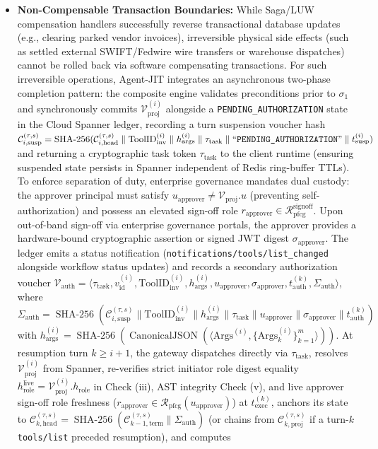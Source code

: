 \documentclass[conference,10pt]{IEEEtran}
\begin{document}
\begin{itemize}
    \item \textbf{Non-Compensable Transaction Boundaries:} While Saga/LUW compensation handlers successfully reverse transactional database updates (e.g., clearing parked vendor invoices), irreversible physical side effects (such as settled external SWIFT/Fedwire wire transfers or warehouse dispatches) cannot be rolled back via software compensating transactions. For such irreversible operations, Agent-JIT integrates an asynchronous two-phase completion pattern: the composite engine validates preconditions prior to $\sigma_1$ and synchronously commits $\mathcal{V}_{\text{proj}}^{(i)}$ alongside a \texttt{PENDING\_AUTHORIZATION} state in the Cloud Spanner ledger, recording a turn suspension voucher hash $\mathcal{C}_{i,\text{susp}}^{(\tau,s)} = \operatorname{SHA-256}(\mathcal{C}_{i,\text{head}}^{(\tau,s)} \parallel \text{ToolID}_{\text{inv}}^{(i)} \parallel h_{\text{args}}^{(i)} \parallel \tau_{\text{task}} \parallel \text{``\texttt{PENDING\_AUTHORIZATION}''} \parallel t_{\text{susp}}^{(i)})$ and returning a cryptographic task token $\tau_{\text{task}}$ to the client runtime (ensuring suspended state persists in Spanner independent of Redis ring-buffer TTLs). To enforce separation of duty, enterprise governance mandates dual custody: the approver principal must satisfy $u_{\text{approver}} \ne \mathcal{V}_{\text{proj}}.u$ (preventing self-authorization) and possess an elevated sign-off role $r_{\text{approver}} \in \mathcal{R}_{\text{pfcg}}^{\text{signoff}}$. Upon out-of-band sign-off via enterprise governance portals, the approver provides a hardware-bound cryptographic assertion or signed JWT digest $\sigma_{\text{approver}}$. The ledger emits a status notification (\texttt{notifications/tools/list\_changed} alongside workflow status updates) and records a secondary authorization voucher $\mathcal{V}_{\text{auth}} = \langle \tau_{\text{task}}, v_{\text{id}}^{(i)}, \text{ToolID}_{\text{inv}}^{(i)}, h_{\text{args}}^{(i)}, u_{\text{approver}}, \sigma_{\text{approver}}, t_{\text{auth}}^{(k)}, \Sigma_{\text{auth}} \rangle$, where $\Sigma_{\text{auth}} = \operatorname{SHA-256}(\mathcal{C}_{i,\text{susp}}^{(\tau,s)} \parallel \text{ToolID}_{\text{inv}}^{(i)} \parallel h_{\text{args}}^{(i)} \parallel \tau_{\text{task}} \parallel u_{\text{approver}} \parallel \sigma_{\text{approver}} \parallel t_{\text{auth}}^{(k)})$ with $h_{\text{args}}^{(i)} = \operatorname{SHA-256}(\operatorname{CanonicalJSON}(\langle \text{Args}^{(i)}, \{\text{Args}_k^{(i)}\}_{k=1}^m \rangle))$. At resumption turn $k \ge i+1$, the gateway dispatches directly via $\tau_{\text{task}}$, resolves $\mathcal{V}_{\text{proj}}^{(i)}$ from Spanner, re-verifies strict initiator role digest equality $h_{\text{role}}^{\text{live}} = \mathcal{V}_{\text{proj}}^{(i)}.h_{\text{role}}$ in Check (iii), AST integrity Check (v), and live approver sign-off role freshness ($r_{\text{approver}} \in \mathcal{R}_{\text{pfcg}}(u_{\text{approver}})$) at $t_{\text{exec}}^{(k)}$, anchors its state to $\mathcal{C}_{k,\text{head}}^{(\tau,s)} = \operatorname{SHA-256}(\mathcal{C}_{k-1,\text{term}}^{(\tau,s)} \parallel \Sigma_{\text{auth}})$ (or chains from $\mathcal{C}_{k,\text{proj}}^{(\tau,s)}$ if a turn-$k$ \texttt{tools/list} preceded resumption), and computes 
\end{itemize}
\end{document}
